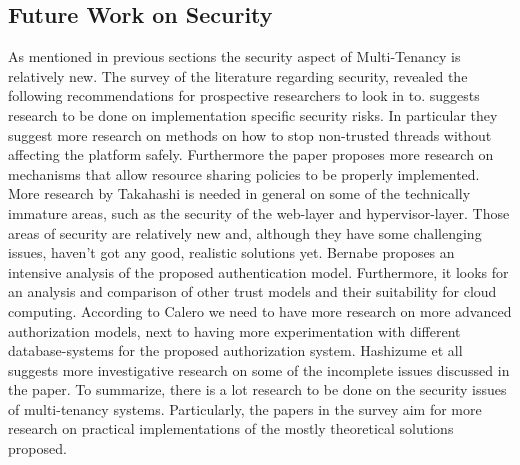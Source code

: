 \subsection{Future Work on Security}
As mentioned in previous sections the security aspect of Multi-Tenancy is relatively new. The survey of the literature regarding security, revealed the following recommendations for prospective researchers to look in to. \cite{Moreno2011Security} suggests research to be done on implementation specific security risks. In particular they suggest more research on methods on how to stop non-trusted threads without affecting the platform safely. Furthermore the paper proposes more research on mechanisms that allow resource sharing policies to be properly implemented. More research by Takahashi\cite{Takahashi2012Security} is needed in general on some of the technically immature areas, such as the security of the web-layer and hypervisor-layer. Those areas of security are relatively new and, although they have some challenging issues, haven't got any good, realistic solutions yet. Bernabe\cite{Bernabe2012Auth} proposes an intensive analysis of the proposed authentication model. Furthermore, it looks for an analysis and comparison of other trust models and their suitability for cloud computing. According to Calero \cite{Calero2010Auth} we need to have more research on more advanced authorization models, next to having more experimentation with different database-systems for the proposed authorization system. Hashizume et all\cite{Hashizume2013Security} suggests more investigative research on some of the incomplete issues discussed in the paper. To summarize, there is a lot research to be done on the security issues of multi-tenancy systems. Particularly, the papers in the survey aim for more research on practical implementations of the mostly theoretical solutions proposed.
